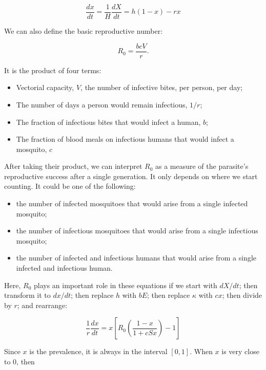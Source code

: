 \documentclass[
]{book}
\begin{document}
\begin{equation}
\frac{dx}{dt} = \frac{1}{H} \frac{dX}{dt} = h (1-x)-r x
\end{equation}

We can also define the basic reproductive number:

\begin{equation}
R_0 = \frac{bcV}{r}.
\end{equation}

It is the product of four terms:

\begin{itemize}
\item
  Vectorial capacity, \(V\), the number of infective bites, per person, per day;
\item
  The number of days a person would remain infectious, \(1/r\);
\item
  The fraction of infectious bites that would infect a human, \(b\);
\item
  The fraction of blood meals on infectious humans that would infect a mosquito, \(c\)
\end{itemize}

After taking their product, we can interpret \(R_0\) as a measure of the parasite's reproductive success after a single generation. It only depends on where we start counting. It could be one of the following:

\begin{itemize}
\item
  the number of infected mosquitoes that would arise from a single infected mosquito;
\item
  the number of infectious mosquitoes that would arise from a single infectious mosquito;
\item
  the number of infected and infectious humans that would arise from a single infected and infectious human.
\end{itemize}

Here, \(R_0\) plays an important role in these equations if we start with \(dX/dt\); then transform it to \(dx/dt\); then replace \(h\) with \(bE\); then replace \(\kappa\) with \(cx\); then divide by \(r\); and rearrange:

\begin{equation}
\frac{1}{r} \frac{dx}{dt} = x \left[R_0 \left(\frac{1-x}{1 + cSx} \right)  - 1\right]  
\end{equation}

Since \(x\) is the prevalence, it is always in the interval \([0,1]\). When \(x\) is very close to \(0\), then
\end{document}
